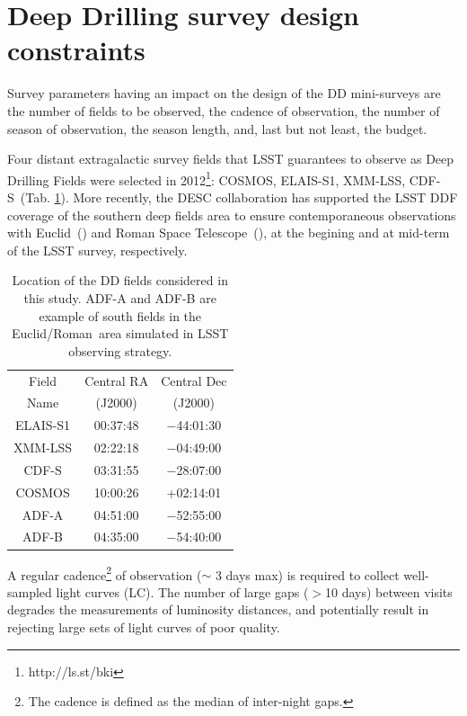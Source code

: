 \documentclass[skiphelvet,twocolumn]{aastex63}
\newcommand{\cosmos}{{COSMOS}}
\newcommand{\elais}{{ELAIS-S1}}
\newcommand{\xmm}{{XMM-LSS}}
\newcommand{\cdfs}{{CDF-S}}
\newcommand{\adfa}{{ADF-A}}
\newcommand{\adfb}{{ADF-B}}
\newcommand{\adfs}{{Euclid/Roman}}
\newcommand{\euclid}{{Euclid}}
\newcommand{\romanspace}{{\sc Roman Space Telescope}}
\begin{document}
\section{Deep Drilling survey design constraints}
\label{sec:design}
Survey parameters having an impact on the design of the DD mini-surveys are the number of fields to be observed, the cadence of observation, the number of season of observation, the season length, and, last but not least, the budget.
\par
Four distant extragalactic survey fields that LSST guarantees to observe as Deep Drilling Fields were selected in 2012\footnote{http://ls.st/bki}: \cosmos, \elais, \xmm, \cdfs~(Tab. \ref{tab:locddf}). More recently, the DESC collaboration has supported the LSST DDF coverage of the southern deep fields area to ensure contemporaneous observations with \euclid~(\citealt{laureijs2011euclid,Amendola_2013}) and \romanspace~(\citealt{spergel2015widefield}), at the begining and at mid-term of the LSST survey, respectively.
\begin{table}[!htbp]
  \caption{Location of the DD fields considered in this study. ADF-A and ADF-B are example of south fields in the \adfs~area simulated in LSST observing strategy.}\label{tab:locddf}
  \begin{center}
    \begin{tabular}{c|c|c}
      \hline
      \hline
      Field & Central RA & Central Dec\\ 
      Name & (J2000)  & (J2000)\\
      \hline
     \elais & 00:37:48 & −44:01:30 \\
     \xmm & 02:22:18 &  −04:49:00 \\
     \cdfs & 03:31:55 & −28:07:00 \\
     \cosmos &10:00:26 & +02:14:01 \\
     \hline 
     \adfa & 04:51:00& −52:55:00 \\
     \adfb & 04:35:00 & −54:40:00 \\
      \hline
      \hline
      \end{tabular}
  \end{center}
\end{table}
\par
A regular cadence\footnote{The cadence is defined as the median of inter-night gaps.} of observation ($\sim$ 3 days max) is required to collect well-sampled light curves (LC). The number of large gaps ($>$10 days) between visits degrades the 
measurements of luminosity distances, and potentially result in rejecting large sets of light curves of poor quality.
\end{document}
